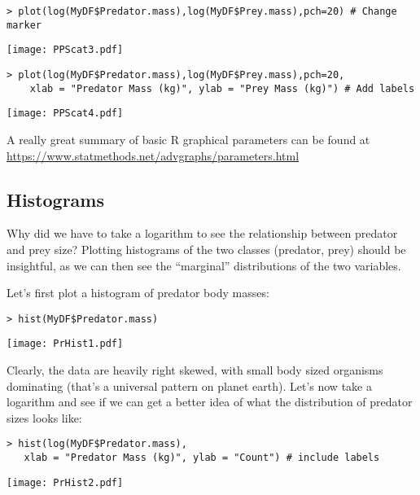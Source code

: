 \begin{lstlisting}
> plot(log(MyDF$Predator.mass),log(MyDF$Prey.mass),pch=20) # Change marker
\end{lstlisting}
\begin{center}
   \texttt{[image: PPScat3.pdf]} 
\end{center}

\begin{lstlisting}
> plot(log(MyDF$Predator.mass),log(MyDF$Prey.mass),pch=20,
    xlab = "Predator Mass (kg)", ylab = "Prey Mass (kg)") # Add labels
\end{lstlisting}
\begin{center}
   \texttt{[image: PPScat4.pdf]} 
\end{center}

\begin{tipbox}
	A really great summary of basic R graphical parameters can be found 
	at \url{https://www.statmethods.net/advgraphs/parameters.html}
\end{tipbox}

\subsection{Histograms}
Why did we have to take a logarithm to see the relationship between 
predator and prey size? Plotting histograms of the two classes 
(predator, prey) should be insightful, as we can then see the 
``marginal'' distributions of the two variables. 

Let's first plot a histogram of predator body masses:
\begin{lstlisting}
> hist(MyDF$Predator.mass)
\end{lstlisting}
\begin{center}
   \texttt{[image: PrHist1.pdf]} 
\end{center}

Clearly, the data are heavily right skewed, with small body sized organisms 
dominating (that's a universal pattern on planet earth). Let's now take 
a logarithm and see if we can get a better idea of what the 
distribution of predator sizes looks like:
\begin{lstlisting}
> hist(log(MyDF$Predator.mass), 
   xlab = "Predator Mass (kg)", ylab = "Count") # include labels
\end{lstlisting}
\begin{center}
   \texttt{[image: PrHist2.pdf]} 
\end{center}

